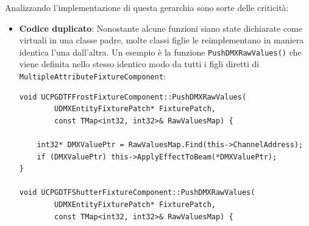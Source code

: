 \documentclass[main.tex]{subfiles}
\begin{document}
\noindent Analizzando l'implementazione di questa gerarchia sono sorte delle criticità:
\begin{itemize}
    \item \textbf{Codice duplicato}: Nonostante alcune funzioni siano state dichiarate come virtuali in una classe padre, molte classi figlie le reimplementano in maniera identica l'una dall'altra. Un esempio è la funzione \lstinline{PushDMXRawValues()} che viene definita nello stesso identico modo da tutti i figli diretti di \lstinline{MultipleAttributeFixtureComponent}:
\lstset{language=UEcpp}
\begin{lstlisting}
void UCPGDTFFrostFixtureComponent::PushDMXRawValues(
        UDMXEntityFixturePatch* FixturePatch,
        const TMap<int32, int32>& RawValuesMap) {

	int32* DMXValuePtr = RawValuesMap.Find(this->ChannelAddress);
	if (DMXValuePtr) this->ApplyEffectToBeam(*DMXValuePtr);
}

void UCPGDTFShutterFixtureComponent::PushDMXRawValues(
        UDMXEntityFixturePatch* FixturePatch,
        const TMap<int32, int32>& RawValuesMap) {


\end{lstlisting}
\end{itemize}
\end{document}
